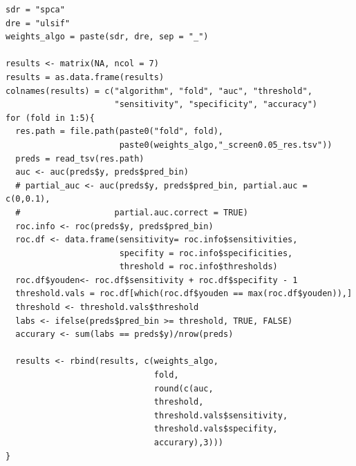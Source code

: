 \documentclass[a4paper,12pt]{article}
\begin{document}
\begin{appendices}
\begin{lstlisting}
sdr = "spca"
dre = "ulsif"
weights_algo = paste(sdr, dre, sep = "_")

results <- matrix(NA, ncol = 7)
results = as.data.frame(results)
colnames(results) = c("algorithm", "fold", "auc", "threshold",
                      "sensitivity", "specificity", "accuracy")
for (fold in 1:5){
  res.path = file.path(paste0("fold", fold),
                       paste0(weights_algo,"_screen0.05_res.tsv"))
  preds = read_tsv(res.path)
  auc <- auc(preds$y, preds$pred_bin)
  # partial_auc <- auc(preds$y, preds$pred_bin, partial.auc = c(0,0.1),
  #                   partial.auc.correct = TRUE)
  roc.info <- roc(preds$y, preds$pred_bin)
  roc.df <- data.frame(sensitivity= roc.info$sensitivities,
                       specifity = roc.info$specificities,
                       threshold = roc.info$thresholds)
  roc.df$youden<- roc.df$sensitivity + roc.df$specifity - 1
  threshold.vals = roc.df[which(roc.df$youden == max(roc.df$youden)),]
  threshold <- threshold.vals$threshold
  labs <- ifelse(preds$pred_bin >= threshold, TRUE, FALSE)
  accurary <- sum(labs == preds$y)/nrow(preds)
  
  results <- rbind(results, c(weights_algo,
                              fold,
                              round(c(auc,
                              threshold,
                              threshold.vals$sensitivity,
                              threshold.vals$specifity,
                              accurary),3)))
}
\end{lstlisting}


\end{appendices}
\pagebreak
\end{document}
